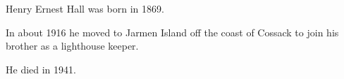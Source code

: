 
Henry Ernest Hall was born in 1869.

In about 1916 he moved to Jarmen Island off the coast of Cossack to join his brother   as a lighthouse keeper.\cite{Connie1983}

He died in 1941.
